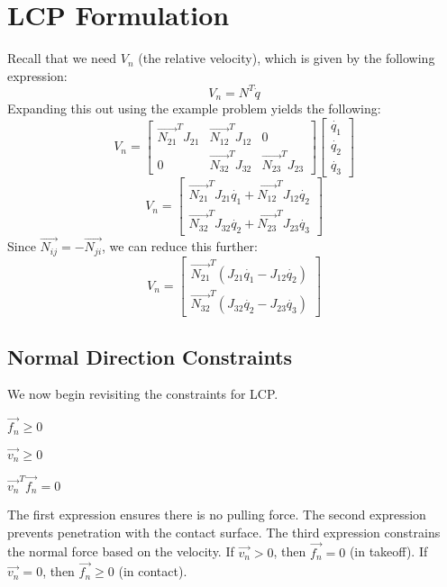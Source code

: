 \section{LCP Formulation}
Recall that we need $V_n$ (the relative velocity), which is given by the following expression:
\begin{equation}
\label{eq:vn0}
V_n = N^T\dot{q}
\end{equation}
Expanding this out using the example problem yields the following:
\begin{equation}
\label{eq:vn1}
V_n = \left[\begin{matrix}\vec{N_{21}}^TJ_{21} & \vec{N_{12}}^TJ_{12} & 0 \\ 0 & \vec{N_{32}}^TJ_{32} & \vec{N_{23}}^TJ_{23}\end{matrix}\right]\left[\begin{matrix}\dot{q_1} \\ \dot{q_2} \\ \dot{q_3}\end{matrix}\right]
\end{equation}
\begin{equation}
\label{eq:vn2}
V_n = \left[\begin{matrix}\vec{N_{21}}^TJ_{21}\dot{q_1} + \vec{N_{12}}^TJ_{12}\dot{q_2} \\ \vec{N_{32}}^TJ_{32}\dot{q_2} + \vec{N_{23}}^TJ_{23}\dot{q_3}\end{matrix}\right]
\end{equation}
Since $\vec{N_{ij}} = -\vec{N_{ji}}$, we can reduce this further:
\begin{equation}
\label{eq:vn3}
V_n = \left[\begin{matrix}\vec{N_{21}}^T(J_{21}\dot{q_1} - J_{12}\dot{q_2}) \\ \vec{N_{32}}^T(J_{32}\dot{q_2} - J_{23}\dot{q_3})\end{matrix}\right]
\end{equation}

\subsection{Normal Direction Constraints}
We now begin revisiting the constraints for LCP.
\begin{packed_item}
\item $\vec{f_n} \geq 0$
\item $\vec{v_n} \geq 0$
\item $\vec{v_n}^T\vec{f_n} = 0$
\end{packed_item}
The first expression ensures there is no pulling force. The second expression prevents penetration with the contact surface. The third expression constrains the normal force based on the velocity. If $\vec{v_n} > 0$, then $\vec{f_n} = 0$ (in takeoff). If $\vec{v_n} = 0$, then $\vec{f_n} \geq 0$ (in contact).

